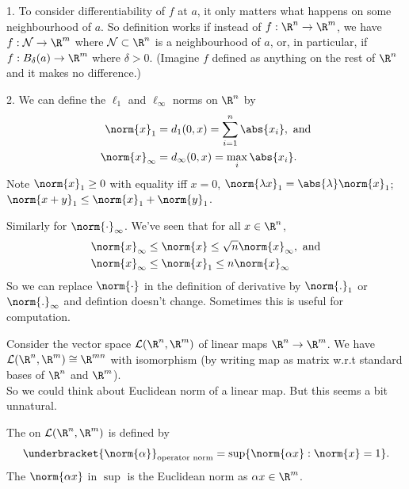 \begin{remark}
    1. To consider differentiability of $f$ at $a$, it only matters what happens on some neighbourhood of $a$.
    So definition works if instead of $f:\R^n\to \R^m$, we have $f:\mathcal{N}\to \R^m$ where $\mathcal{N}\subset \R^n$ is a neighbourhood of $a$, or, in particular, if $f:B_\delta(a)\to \R^m$ where $\delta > 0$.
    (Imagine $f$ defined as anything on the rest of $\R^n$ and it makes no difference.)

    2. We can define the $\ell_1$ and $\ell_\infty$ norms on $\R^n$ by
    \begin{align*}
        \norm{x}_1 &= d_1(0,x) =  \sum_{i=1}^n \abs{x_i}, \textup{ and}\\
        \norm{x}_\infty & =  d_\infty(0,x) = \max_i\abs{x_i}.
    \end{align*}
    Note $\norm{x}_1\ge 0$ with equality iff $x=0$, $\norm{\lambda x}_1 = \abs{\lambda}\norm{x}_1$; $\norm{x+y}_1 \leq \norm{x}_1 + \norm{y}_1$.

    Similarly for $\norm{\cdot}_\infty$. We've seen that for all $x\in \R^n$,
    \begin{align*}
        \norm{x}_\infty &\leq \norm{x} \leq \sqrt{n}\norm{x}_\infty, \textup{ and}\\
        \norm{x}_\infty &\leq \norm{x}_1 \leq n\norm{x}_\infty
    \end{align*}
    So we can replace $\norm{\cdot}$ in the definition of derivative by $\norm{.}_1$ or $\norm{.}_\infty$ and defintion doesn't change. Sometimes this is useful for computation.
\end{remark}

Consider the vector space $\mathcal{L}(\R^n,\R^m)$ of linear maps $\R^n\to \R^m$. We have $\mathcal{L}(\R^n,\R^m) \cong \R^{mn}$ with isomorphism (by writing map as matrix w.r.t standard bases of $\R^n$ and $\R^m$). \\
So we could think about Euclidean norm of a linear map. But this seems a bit unnatural.

\begin{definition}
    The  on $\mathcal{L}(\R^n,\R^m)$ is defined by
    \begin{align*}
        \underbracket{\norm{\alpha}}_{\textup{operator norm}} = \sup\Set{ \norm{\alpha x}}{\norm{x} = 1}.
    \end{align*}
    The $\norm{\alpha x}$ in $\sup$ is the Euclidean norm as $\alpha  x\in \R^m$.
\end{definition}


